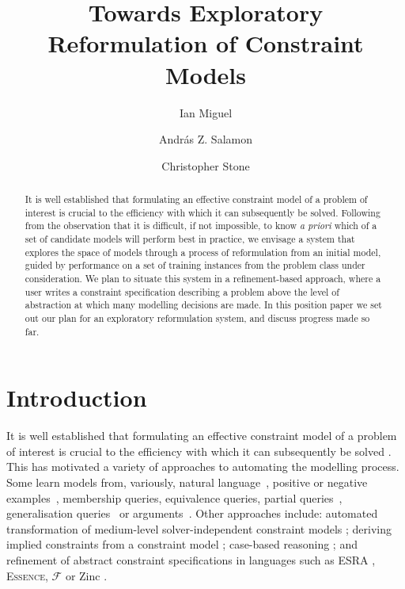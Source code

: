 \documentclass[a4paper,UKenglish,cleveref, autoref,pdfa]{lipics-v2021}
\title{Towards Exploratory Reformulation of Constraint Models} %
\author{Ian Miguel}{School of Computer Science, University of St Andrews, UK}{ijm@st-andrews.ac.uk}{https://orcid.org/0000-0002-6930-2686}{EPSRC grant EP/V027182/1}
\author{Andr\'as Z. Salamon}{School of Computer Science, University of St Andrews, UK}{Andras.Salamon@st-andrews.ac.uk}{https://orcid.org/0000-0002-1415-9712}{}
\author{Christopher Stone}{School of Computer Science, University of St Andrews, UK}{cls29@st-andrews.ac.uk}{https://orcid.org/0000-0002-9512-9987}{EPSRC grant EP/V027182/1}
\newcommand{\essence}[0]{\textsc{Essence}\xspace}
\begin{document}
\maketitle

\begin{abstract}
It is well established that formulating an effective constraint model of a problem of interest
is crucial to the efficiency with which it can subsequently be solved. Following from the observation that it is difficult, if not impossible, to know {\em a priori} which of a set of candidate models will perform best in practice, we envisage a system that explores the space of models through a process of reformulation from an initial model, guided by performance on a set of training instances from the problem class under consideration. We plan to situate this system in a refinement-based approach, where a user writes a constraint specification describing a problem above the level of abstraction at which many modelling decisions are made. In this position paper we set out our plan for an exploratory reformulation system, and discuss progress made so far.
\end{abstract}


\section{Introduction}

It is well established that formulating an effective constraint model of a problem of interest is crucial to the efficiency with which it can subsequently be solved \cite{freuder2018:progress}. This has motivated a variety of approaches to automating the modelling process. Some
learn models from, variously, natural language~\cite{Kiziltan2016:constraint}, positive or negative examples~\cite{DeRaedt2018:learning,Bessiere2017:constraint,Arcangioli2016:multiple}, membership queries, equivalence queries, partial queries~\cite{Beldiceanu2012:model, Bessiere2013:constraint}, generalisation queries~\cite{Bessiere2014:boosting} or arguments~\cite{Shchekotykhin2009:argumentation}. 
Other approaches include: automated transformation of medium-level solver-independent constraint models \cite{Rendl2010:thesis,Nethercote2007:minizinc,OPLBook,Mills1999:eacl,Nightingale2014:automatically,savilerow,Nightingale2015:automatically}; deriving implied constraints from a constraint model \cite{frisch2003:cgrass,colton2001:constraint, charnley2006:automatic, Bessiere2007:learning,Leo2013:globalizing}; case-based reasoning \cite{Little2003:using}; and refinement of abstract constraint specifications \cite{Frisch2005:rules} in languages such as ESRA \cite{Flener2003:esra}, \essence \cite{frisch2008:essence}, ${\mathcal F}$ \cite{Hnich2003:function} or Zinc \cite{marriott2008:design,ZincModref10,Rafeh2016:linzinc}.
\end{document}
